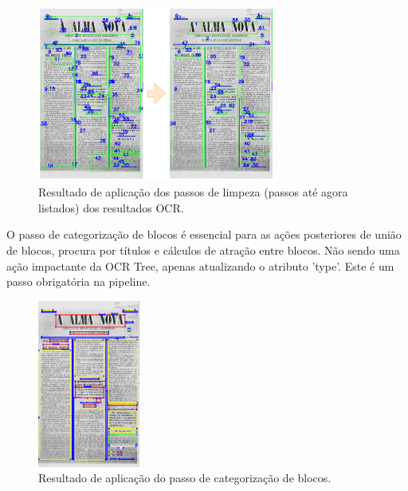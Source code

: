 \begin{figure}[H]
	\centering
	\includegraphics[width=0.7\textwidth]{images/ilustracoes/pipeline_clean_ocr_example.png}
	\caption{Resultado de aplicação dos passos de limpeza (passos até agora listados) dos resultados OCR.}
	\label{fig:pipeline_clean_ocr_example}
\end{figure}



O passo de categorização de blocos é essencial para as ações posteriores de união de blocos, procura por títulos e cálculos de atração entre blocos. Não sendo uma ação impactante da OCR Tree, apenas atualizando o atributo 'type'. Este é um passo obrigatória na pipeline.

\begin{figure}[H]
	\centering
	\includegraphics[width=0.3\textwidth]{images/ilustracoes/pipeline_categorize_ocr_example.png}
	\caption{Resultado de aplicação do passo de categorização de blocos.}
	\label{fig:pipeline_categorize_ocr_example}
\end{figure}




